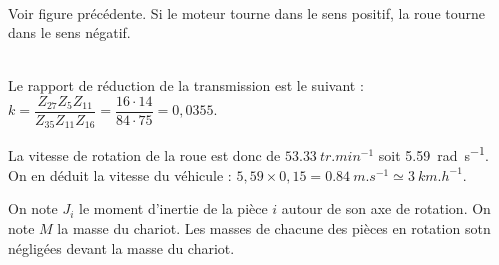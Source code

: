 %


\ifprof ~\\
Voir figure précédente. Si le moteur tourne dans le sens positif, la roue tourne dans le sens négatif. 
\else
\fi

\ifprof ~\\
Le rapport de réduction de la transmission est le suivant : 
$k=\dfrac{Z_{27} Z_{5} Z_{11} }{Z_{35} Z_{11} Z_{16}} = \dfrac{16\cdot 14}{84\cdot 75} =0,0355 $.

La vitesse de rotation de la roue est donc de $\SI{53,33}{tr.min^{-1}}$ soit \SI{5,59}{rad.s^{-1}}. 
On en déduit la vitesse du véhicule : $5,59 \times 0,15 = \SI{0,84}{m.s^{-1}}\simeq \SI{3}{km.h^{-1}}$.

\else
\fi


On note $J_i$ le moment d'inertie de la pièce $i$ autour de son axe de rotation. On note $M$ la masse du chariot. Les masses de chacune des pièces en rotation sotn négligées devant la masse du chariot.
\ifprof ~\\
\else
\fi

\ifprof ~\\
\else
\fi



\ifprof
\else


\fi